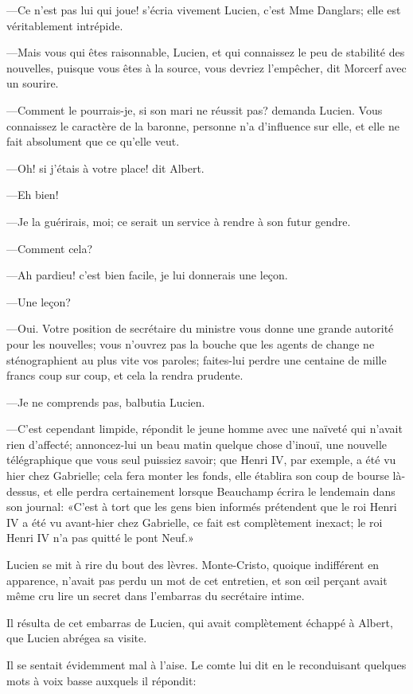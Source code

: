—Ce n'est pas lui qui joue! s'écria vivement Lucien, c'est Mme Danglars; elle est véritablement intrépide. 

—Mais vous qui êtes raisonnable, Lucien, et qui connaissez le peu de stabilité des nouvelles, puisque vous êtes à la source, vous devriez l'empêcher, dit Morcerf avec un sourire. 

—Comment le pourrais-je, si son mari ne réussit pas? demanda Lucien. Vous connaissez le caractère de la baronne, personne n'a d'influence sur elle, et elle ne fait absolument que ce qu'elle veut. 

—Oh! si j'étais à votre place! dit Albert. 

—Eh bien! 

—Je la guérirais, moi; ce serait un service à rendre à son futur gendre. 

—Comment cela? 

—Ah pardieu! c'est bien facile, je lui donnerais une leçon. 

—Une leçon? 

—Oui. Votre position de secrétaire du ministre vous donne une grande autorité pour les nouvelles; vous n'ouvrez pas la bouche que les agents de change ne sténographient au plus vite vos paroles; faites-lui perdre une centaine de mille francs coup sur coup, et cela la rendra prudente. 

—Je ne comprends pas, balbutia Lucien. 

—C'est cependant limpide, répondit le jeune homme avec une naïveté qui n'avait rien d'affecté; annoncez-lui un beau matin quelque chose d'inouï, une nouvelle télégraphique que vous seul puissiez savoir; que Henri IV, par exemple, a été vu hier chez Gabrielle; cela fera monter les fonds, elle établira son coup de bourse là-dessus, et elle perdra certainement lorsque Beauchamp écrira le lendemain dans son journal: «C'est à tort que les gens bien informés prétendent que le roi Henri IV a été vu avant-hier chez Gabrielle, ce fait est complètement inexact; le roi Henri IV n'a pas quitté le pont Neuf.» 

Lucien se mit à rire du bout des lèvres. Monte-Cristo, quoique indifférent en apparence, n'avait pas perdu un mot de cet entretien, et son œil perçant avait même cru lire un secret dans l'embarras du secrétaire intime. 

Il résulta de cet embarras de Lucien, qui avait complètement échappé à Albert, que Lucien abrégea sa visite. 

Il se sentait évidemment mal à l'aise. Le comte lui dit en le reconduisant quelques mots à voix basse auxquels il répondit: 


